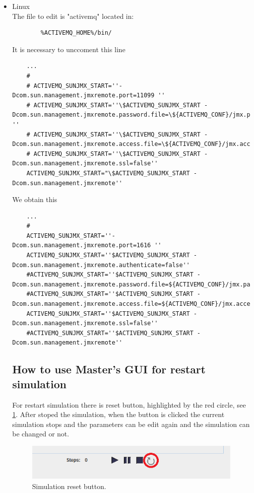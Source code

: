 \documentclass{article}
\begin{document}
\begin{itemize}
\item Linux\\
The file to edit is "activemq" located in:
\lstset{language=Java}
\begin{lstlisting}	
		%ACTIVEMQ_HOME%/bin/
\end{lstlisting}
It is necessary to unccoment this line

\begin{lstlisting}
	...
	#
	# ACTIVEMQ_SUNJMX_START=''-Dcom.sun.management.jmxremote.port=11099 ''
	# ACTIVEMQ_SUNJMX_START=''\$ACTIVEMQ_SUNJMX_START -Dcom.sun.management.jmxremote.password.file=\${ACTIVEMQ_CONF}/jmx.password ''
	# ACTIVEMQ_SUNJMX_START=''\$ACTIVEMQ_SUNJMX_START -Dcom.sun.management.jmxremote.access.file=\${ACTIVEMQ_CONF}/jmx.access''
	# ACTIVEMQ_SUNJMX_START=''\$ACTIVEMQ_SUNJMX_START -Dcom.sun.management.jmxremote.ssl=false''
	ACTIVEMQ_SUNJMX_START="\$ACTIVEMQ_SUNJMX_START -Dcom.sun.management.jmxremote''
\end{lstlisting}

We obtain this
\begin{lstlisting}
	...
	#
	ACTIVEMQ_SUNJMX_START=''-Dcom.sun.management.jmxremote.port=1616 ''
	ACTIVEMQ_SUNJMX_START=''$ACTIVEMQ_SUNJMX_START -Dcom.sun.management.jmxremote.authenticate=false''
	#ACTIVEMQ_SUNJMX_START=''$ACTIVEMQ_SUNJMX_START -Dcom.sun.management.jmxremote.password.file=${ACTIVEMQ_CONF}/jmx.password''
	#ACTIVEMQ_SUNJMX_START=''$ACTIVEMQ_SUNJMX_START -Dcom.sun.management.jmxremote.access.file=${ACTIVEMQ_CONF}/jmx.access''
	ACTIVEMQ_SUNJMX_START=''$ACTIVEMQ_SUNJMX_START -Dcom.sun.management.jmxremote.ssl=false''
	#ACTIVEMQ_SUNJMX_START=''$ACTIVEMQ_SUNJMX_START -Dcom.sun.management.jmxremote''

\end{lstlisting}

\subsection{How to use Master’s GUI for restart simulation}

For restart simulation there is reset button, highlighted by the red circle, see \ref{fig:mastersr}. After stoped the simulation, when the button is clicked the current simulation stops and the parameters can be edit again and the simulation can be changed or not.

\begin{figure}
\centering
\includegraphics[width=1.3\textwidth, bb=0 0 1012 300]{resetDetail.png}
\caption{Simulation reset button. \label{fig:mastersr}}
\end{figure}


\end{itemize}
\end{document}
